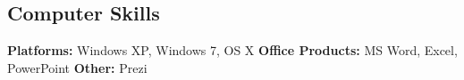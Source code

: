 \documentclass[]{friggeri-cv} %
\begin{document}
\begin{entrylist}



\end{entrylist}



\begin{aside} %
\section{Computer Skills\cite{paper}}
{\bf Platforms: } Windows XP, Windows 7, OS X
{\bf Office Products: }MS Word, Excel, PowerPoint
{\bf Other: }Prezi
\end{aside}
\end{document}
